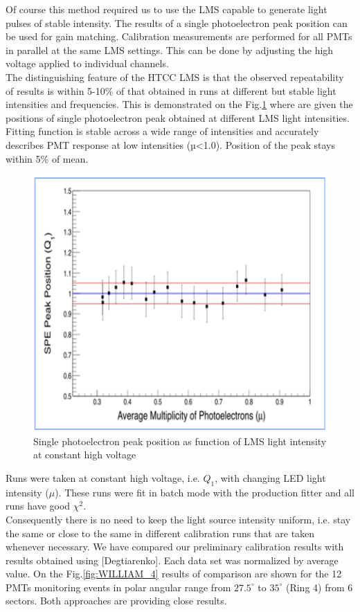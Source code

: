 Of course this method required us to use the LMS capable to generate light pulses of stable intensity. The results of a single photoelectron peak position can be used for gain matching. Calibration measurements are performed for all PMTs in parallel at the same LMS settings. This can be done by adjusting the high voltage applied to individual channels. \\
\indent The distinguishing feature of the HTCC LMS is that the observed repeatability of results is within 5-10\% of that obtained in runs at different but stable light intensities and frequencies. This is demonstrated on the Fig.\ref{fig:WILLIAM_5}
where are given the positions of single photoelectron peak obtained at different LMS light intensities. Fitting function is stable across a wide range of intensities and accurately describes PMT response at low intensities (µ<1.0). Position of the peak stays within 5\% of mean.

\begin{figure}[h]
\centering
\includegraphics[width=0.99\linewidth]{images/WILLIAM_5.png}
\caption{Single photoelectron peak position as function of LMS light intensity at constant high voltage}
\label{fig:WILLIAM_5}
\end{figure}

Runs were taken at constant high voltage, i.e. $Q_{ 1}$, with changing LED light intensity ($\mu$). These runs were fit in batch mode with the production fitter and all runs have good $\chi{^2}$.\\ 
\indent Consequently there is no need to keep the light source intensity uniform, i.e. stay the same or close to the same in different calibration runs that are taken whenever necessary.
We have compared our preliminary calibration results with results obtained using [Degtiarenko]. Each data set was normalized by average value. On the Fig.\ref{fig:WILLIAM_4} results of comparison are shown for the 12 PMTs monitoring events in polar angular range from $27.5^\circ$ to $35^\circ$ (Ring 4) from 6 sectors. Both approaches are providing close results.

